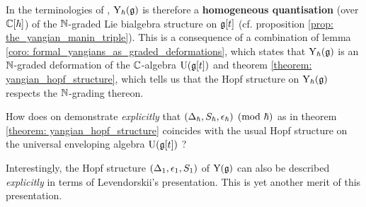             \begin{remark}
                In the terminologies of \cite{wendlandt_restricted_quantum_doubles_of_yangians}, $\mathrm{Y}_{\hbar}(\mathfrak{g})$ is therefore a \textbf{homogeneous quantisation} (over $\mathbb{C}[\hbar]$) of the $\mathbb{N}$-graded Lie bialgebra structure on $\mathfrak{g}[t]$ (cf. proposition \ref{prop: the_yangian_manin_triple}). This is a consequence of a combination of lemma \ref{coro: formal_yangians_as_graded_deformations}, which states that $\mathrm{Y}_{\hbar}(\mathfrak{g})$ is an $\mathbb{N}$-graded deformation of the $\mathbb{C}$-algebra $\mathrm{U}(\mathfrak{g}[t])$ and theorem \ref{theorem: yangian_hopf_structure}, which tells us that the Hopf structure on $\mathrm{Y}_{\hbar}(\mathfrak{g})$ respects the $\mathbb{N}$-grading thereon. 
            \end{remark}
            \begin{question}
                How does on demonstrate \textit{explicitly} that $(\Delta_{\hbar}, S_{\hbar}, \epsilon_{\hbar}) \pmod{\hbar}$ as in theorem \ref{theorem: yangian_hopf_structure} coincides with the usual Hopf structure on the universal enveloping algebra $\mathrm{U}(\mathfrak{g}[t])$ ?
            \end{question}
            Interestingly, the Hopf structure $(\Delta_1, \epsilon_1, S_1)$ of $\mathrm{Y}(\mathfrak{g})$ can also be described \textit{explicitly} in terms of Levendorskii's presentation. This is yet another merit of this presentation. 
